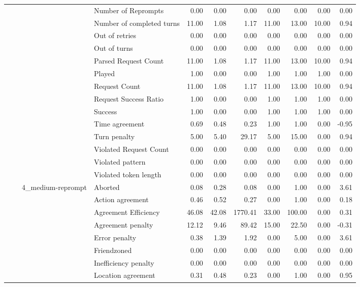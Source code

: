 \begin{tabular}{llllrrrrrrr}
 &  &  & Number of Reprompts & 0.00 & 0.00 & 0.00 & 0.00 & 0.00 & 0.00 & 0.00 \\
 &  &  & Number of completed turns & 11.00 & 1.08 & 1.17 & 11.00 & 13.00 & 10.00 & 0.94 \\
 &  &  & Out of retries & 0.00 & 0.00 & 0.00 & 0.00 & 0.00 & 0.00 & 0.00 \\
 &  &  & Out of turns & 0.00 & 0.00 & 0.00 & 0.00 & 0.00 & 0.00 & 0.00 \\
 &  &  & Parsed Request Count & 11.00 & 1.08 & 1.17 & 11.00 & 13.00 & 10.00 & 0.94 \\
 &  &  & Played & 1.00 & 0.00 & 0.00 & 1.00 & 1.00 & 1.00 & 0.00 \\
 &  &  & Request Count & 11.00 & 1.08 & 1.17 & 11.00 & 13.00 & 10.00 & 0.94 \\
 &  &  & Request Success Ratio & 1.00 & 0.00 & 0.00 & 1.00 & 1.00 & 1.00 & 0.00 \\
 &  &  & Success & 1.00 & 0.00 & 0.00 & 1.00 & 1.00 & 1.00 & 0.00 \\
 &  &  & Time agreement & 0.69 & 0.48 & 0.23 & 1.00 & 1.00 & 0.00 & -0.95 \\
 &  &  & Turn penalty & 5.00 & 5.40 & 29.17 & 5.00 & 15.00 & 0.00 & 0.94 \\
 &  &  & Violated Request Count & 0.00 & 0.00 & 0.00 & 0.00 & 0.00 & 0.00 & 0.00 \\
 &  &  & Violated pattern & 0.00 & 0.00 & 0.00 & 0.00 & 0.00 & 0.00 & 0.00 \\
 &  &  & Violated token length & 0.00 & 0.00 & 0.00 & 0.00 & 0.00 & 0.00 & 0.00 \\
\cline{3-11}
 &  & \multirow[t]{27}{*}{4_medium-reprompt} & Aborted & 0.08 & 0.28 & 0.08 & 0.00 & 1.00 & 0.00 & 3.61 \\
 &  &  & Action agreement & 0.46 & 0.52 & 0.27 & 0.00 & 1.00 & 0.00 & 0.18 \\
 &  &  & Agreement Efficiency & 46.08 & 42.08 & 1770.41 & 33.00 & 100.00 & 0.00 & 0.31 \\
 &  &  & Agreement penalty & 12.12 & 9.46 & 89.42 & 15.00 & 22.50 & 0.00 & -0.31 \\
 &  &  & Error penalty & 0.38 & 1.39 & 1.92 & 0.00 & 5.00 & 0.00 & 3.61 \\
 &  &  & Friendzoned & 0.00 & 0.00 & 0.00 & 0.00 & 0.00 & 0.00 & 0.00 \\
 &  &  & Inefficiency penalty & 0.00 & 0.00 & 0.00 & 0.00 & 0.00 & 0.00 & 0.00 \\
 &  &  & Location agreement & 0.31 & 0.48 & 0.23 & 0.00 & 1.00 & 0.00 & 0.95 \\

\end{tabular}
